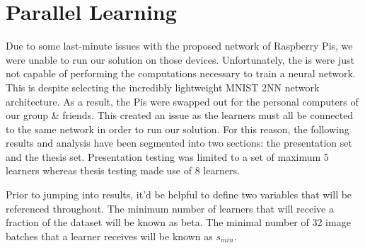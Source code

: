 \documentclass[../mthe-493-final-project.tex]{subfiles}
\begin{document}
    \section{Parallel Learning}
    Due to some last-minute issues with the proposed network of Raspberry Pis, we were unable to run our solution on those devices. Unfortunately, the is were just not capable of performing the computations necessary to train a neural network. This is despite selecting the incredibly lightweight MNIST 2NN network architecture. As a result, the Pis were swapped out for the personal computers of our group \& friends. This created an issue as the learners must all be connected to the same network in order to run our solution. For this reason, the following results and analysis have been segmented into two sections: the presentation set and the thesis set. Presentation testing was limited to a set of maximum 5 learners whereas thesis testing made use of 8 learners.

    Prior to jumping into results, it’d be helpful to define two variables that will be referenced throughout. The minimum number of learners that will receive a fraction of the dataset will be known as beta. The minimal number of 32 image batches that a learner receives will be known as $s_{min}$.
    
\end{document}
